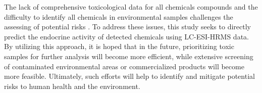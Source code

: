 The lack of comprehensive toxicological data for all chemicals compounds and the difficulty to identify all chemicals in environmental samples challenges the assessing of potential risks \cite{Grandjean2014}\cite{Vandenberg2016}. To address these issues, this study seeks to directly predict the endocrine activity of detected chemicals using LC-ESI-HRMS data. By utilizing this approach, it is hoped that in the future, prioritizing toxic samples for further analysis will become more efficient, while extensive screening of contaminated environmental areas or commercialized products will become more feasible. Ultimately, such efforts will help to identify and mitigate potential risks to human health and the environment.

